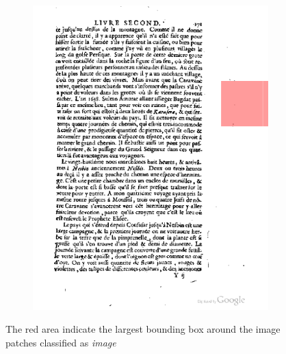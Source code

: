\begin{figure}[H]
\begin{subfigure}[b]{0.49\textwidth}
		\includegraphics[width=.49\textwidth]{resources/bad_extract_pic8}
	\end{subfigure}
	\caption{The red area indicate the largest bounding box around the image
patches classified as \emph{image}}
	\label{fig:imagesExtracted}
\end{figure}
